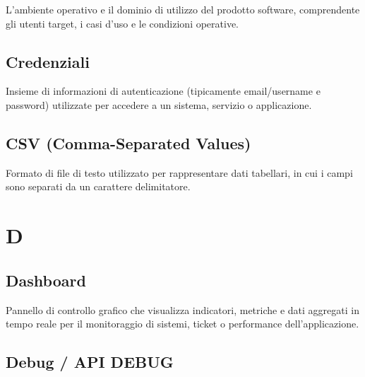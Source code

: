 \documentclass[a4paper, 11pt, oneside]{scrartcl} %
\begin{document}
L'ambiente operativo e il dominio di utilizzo del prodotto software, comprendente gli utenti target, i casi d'uso e le condizioni operative.

\vspace{0.5cm}

\subsection*{Credenziali}


Insieme di informazioni di autenticazione (tipicamente email/username e password) utilizzate per accedere a un sistema, servizio o applicazione.

\vspace{0.5cm}

\subsection*{CSV (Comma-Separated Values)}
Formato di file di testo utilizzato per rappresentare dati tabellari, in cui i campi sono separati da un carattere delimitatore.
\vspace{0.5cm}


\section*{D}


\subsection*{Dashboard}


Pannello di controllo grafico che visualizza indicatori, metriche e dati aggregati in tempo reale per il monitoraggio di sistemi, ticket o performance dell'applicazione.

\vspace{0.5cm}

\subsection*{Debug / API DEBUG}

\end{document}
